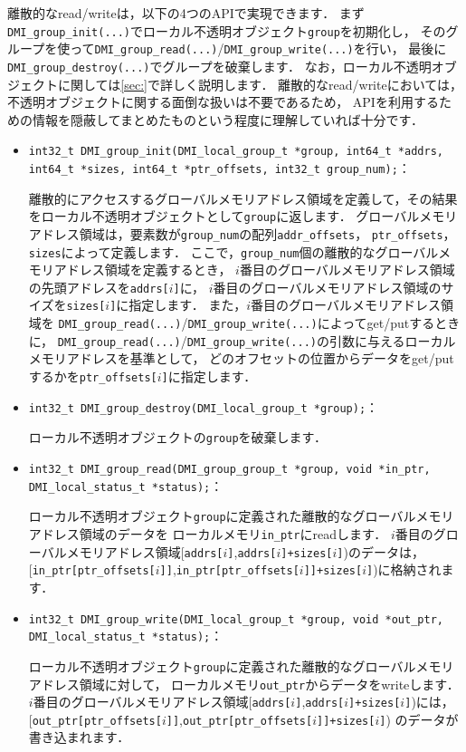 \documentclass[report,12pt]{jsbook}
\begin{document}
離散的なread/writeは，以下の4つのAPIで実現できます．
まず\texttt{DMI\_group\_init(...)}でローカル不透明オブジェクト\texttt{group}を初期化し，
そのグループを使って\texttt{DMI\_group\_read(...)}/\texttt{DMI\_group\_write(...)}を行い，
最後に\texttt{DMI\_group\_destroy(...)}でグループを破棄します．
なお，ローカル不透明オブジェクトに関しては\ref{sec:}で詳しく説明します．
離散的なread/writeにおいては，不透明オブジェクトに関する面倒な扱いは不要であるため，
APIを利用するための情報を隠蔽してまとめたものという程度に理解していれば十分です．
\begin{itemize}
\item \texttt{int32\_t DMI\_group\_init(DMI\_local\_group\_t *group, int64\_t *addrs, int64\_t *sizes, int64\_t *ptr\_offsets, int32\_t group\_num);}：
  
  離散的にアクセスするグローバルメモリアドレス領域を定義して，その結果をローカル不透明オブジェクトとして\texttt{group}に返します．
  グローバルメモリアドレス領域は，要素数が\texttt{group\_num}の配列\texttt{addr\_offsets}，
  \texttt{ptr\_offsets}，\texttt{sizes}によって定義します．
  ここで，\texttt{group\_num}個の離散的なグローバルメモリアドレス領域を定義するとき，
  $i$番目のグローバルメモリアドレス領域の先頭アドレスを\texttt{addrs[$i$]}に，
  $i$番目のグローバルメモリアドレス領域のサイズを\texttt{sizes[$i$]}に指定します．
  また，$i$番目のグローバルメモリアドレス領域を
  \texttt{DMI\_group\_read(...)}/\texttt{DMI\_group\_write(...)}によってget/putするときに，
  \texttt{DMI\_group\_read(...)}/\texttt{DMI\_group\_write(...)}の引数に与えるローカルメモリアドレスを基準として，
  どのオフセットの位置からデータをget/putするかを\texttt{ptr\_offsets[$i$]}に指定します．
\item \texttt{int32\_t DMI\_group\_destroy(DMI\_local\_group\_t *group);}：
  
  ローカル不透明オブジェクトの\texttt{group}を破棄します．
\item \texttt{int32\_t DMI\_group\_read(DMI\_group\_group\_t *group, void *in\_ptr, DMI\_local\_status\_t *status);}：
  
  ローカル不透明オブジェクト\texttt{group}に定義された離散的なグローバルメモリアドレス領域のデータを
  ローカルメモリ\texttt{in\_ptr}にreadします．
  $i$番目のグローバルメモリアドレス領域[\texttt{addrs[$i$]},\texttt{addrs[$i$]+sizes[$i$]})のデータは，
  [\texttt{in\_ptr[ptr\_offsets[$i$]]},\texttt{in\_ptr[ptr\_offsets[$i$]]+sizes[$i$]})に格納されます．
\item \texttt{int32\_t DMI\_group\_write(DMI\_local\_group\_t *group, void *out\_ptr, DMI\_local\_status\_t *status);}：
  
  ローカル不透明オブジェクト\texttt{group}に定義された離散的なグローバルメモリアドレス領域に対して，
  ローカルメモリ\texttt{out\_ptr}からデータをwriteします．
  $i$番目のグローバルメモリアドレス領域[\texttt{addrs[$i$]},\texttt{addrs[$i$]+sizes[$i$]})には，
  [\texttt{out\_ptr[ptr\_offsets[$i$]]},\texttt{out\_ptr[ptr\_offsets[$i$]]+sizes[$i$]})
  のデータが書き込まれます．
\end{itemize}
\end{document}
